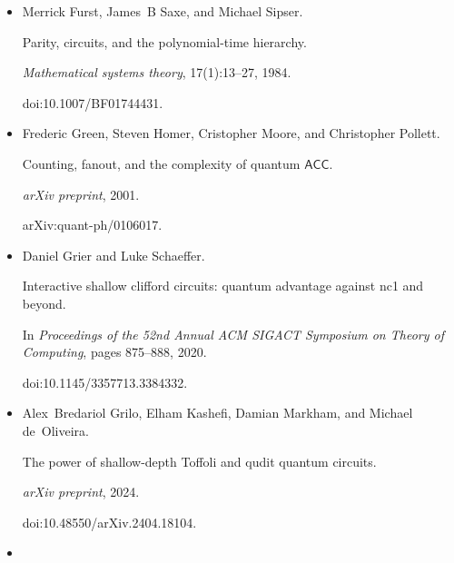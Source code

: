 \begin{itemize}
Quantum lower bounds for fanout.


\emph{Quantum Information and Computation}, 6(1):046–057, 2006.


doi:10.26421/QIC6.1-3.





\item[] 
[7]

Merrick Furst, James B Saxe, and Michael Sipser.


Parity, circuits, and the polynomial-time hierarchy.


\emph{Mathematical systems theory}, 17(1):13–27, 1984.


doi:10.1007/BF01744431.





\item[] 
[8]

Frederic Green, Steven Homer, Cristopher Moore, and Christopher Pollett.


Counting, fanout, and the complexity of quantum ${\mathsf{ACC}}$.


\emph{arXiv preprint}, 2001.


arXiv:quant-ph/0106017.





\item[] 
[9]

Daniel Grier and Luke Schaeffer.


Interactive shallow clifford circuits: quantum advantage against
nc1 and beyond.


In \emph{Proceedings of the 52nd Annual ACM SIGACT Symposium on Theory
of Computing}, pages 875–888, 2020.


doi:10.1145/3357713.3384332.





\item[] 
[10]

Alex Bredariol Grilo, Elham Kashefi, Damian Markham, and Michael de Oliveira.


The power of shallow-depth Toffoli and qudit quantum circuits.


\emph{arXiv preprint}, 2024.


doi:10.48550/arXiv.2404.18104.





\item[] 
[11]


\end{itemize}
